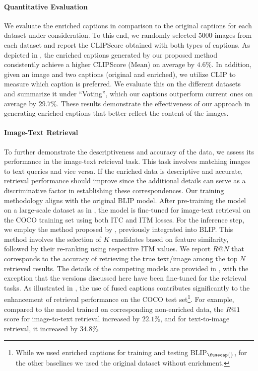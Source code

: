 \vspace{-10pt}
\paragraph{Quantitative Evaluation}
We evaluate the enriched captions in comparison to the original captions for each dataset under consideration. To this end, we randomly selected 5000 images from each dataset and report the CLIPScore obtained with both types of captions.
As depicted in , the enriched captions generated by our proposed method consistently achieve a higher CLIPScore (Mean) on average by $4.6\%$.
In addition, given an image and two captions (original and enriched), we utilize CLIP to measure which caption is preferred. We evaluate this on the different datasets and summarize it under ``Voting'', which our captions outperform current ones on average by $29.7\%$.
These results demonstrate the effectiveness of our approach in generating enriched captions that better reflect the content of the images.
\vspace{-20pt}

\paragraph{Image-Text Retrieval}\label{Se:image-text-retrieval}
To further demonstrate the descriptiveness and accuracy of the \fusecap{} data, we assess its performance in the image-text retrieval task.
This task involves matching images to text queries and vice versa.
If the enriched data is descriptive and accurate, retrieval performance should improve since the additional details can serve as a discriminative factor in establishing these correspondences.
Our training methodology aligns with the original BLIP model.
After pre-training the model on a large-scale dataset as in , the model is fine-tuned for image-text retrieval on the COCO training set using both ITC and ITM losses.
For the inference step, we employ the method proposed by \cite{li2021align}, previously integrated into BLIP.
This method involves the selection of $K$ candidates based on feature similarity, followed by their re-ranking using respective ITM values.
We report $R@N$ that corresponds to the accuracy of retrieving the true text/image among the top $N$ retrieved results.
The details of the competing models are provided in , with the exception that the versions discussed here have been fine-tuned for the retrieval tasks.
As illustrated in , the use of fused captions contributes significantly to the enhancement of retrieval performance on the COCO test set\footnote{While we used enriched captions for training and testing BLIP$_\fusecap{}$, for the other baselines we used the original dataset without enrichment.}.
For example, compared to the model trained on corresponding non-enriched data, the $R@1$ score for image-to-text retrieval increased by $22.1\%$, and for text-to-image retrieval, it increased by $34.8\%$.



